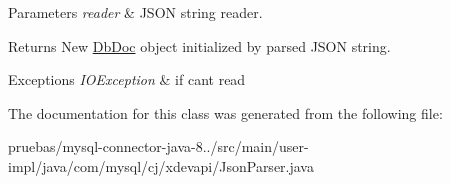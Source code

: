 \begin{DoxyParams}{Parameters}
{\em reader} & J\+S\+ON string reader. \\
\hline
\end{DoxyParams}
\begin{DoxyReturn}{Returns}
New \mbox{\hyperlink{interfacecom_1_1mysql_1_1cj_1_1xdevapi_1_1_db_doc}{Db\+Doc}} object initialized by parsed J\+S\+ON string. 
\end{DoxyReturn}

\begin{DoxyExceptions}{Exceptions}
{\em I\+O\+Exception} & if can\textquotesingle{}t read \\
\hline
\end{DoxyExceptions}


The documentation for this class was generated from the following file\+:\begin{DoxyCompactItemize}
\item 
pruebas/mysql-\/connector-\/java-\/8../src/main/user-\/impl/java/com/mysql/cj/xdevapi/Json\+Parser.\+java\end{DoxyCompactItemize}
